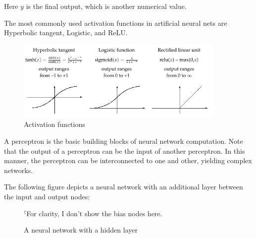 \documentclass[final]{ua-thesis}
\numberwithin{equation}{section}
\begin{document}
Here $y$ is the final output, which is another numerical value. 

The most commonly used activation functions in artificial neural nets are Hyperbolic tangent, Logistic, and ReLU.

\begin{figure}
\caption{Activation functions}
\centering
\includegraphics[width=0.9\textwidth]{activation_function.png}
\end{figure} 

A perceptron is the basic building blocks of neural network computation. Note that the output of a perceptron can be the input of another perceptron. 
In this manner, the perceptron can be interconnected to one and other, yielding complex networks. 

The following figure depicts a neural network with an additional layer between the input and output nodes:

\begin{figure}[h!]
\caption{A neural network with a hidden layer}
\centering
{}

\rule{0in}{1.2em}$^\dag$\scriptsize For clarity, I don't show the bias nodes here.\\

\end{figure}    
\end{document}
